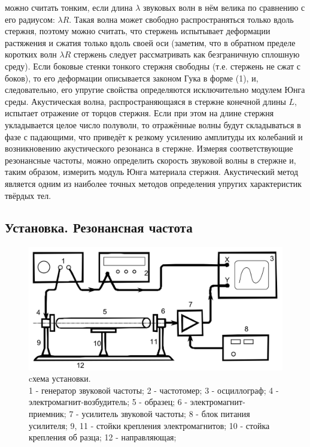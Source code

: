 \documentclass[a4paper, 10pt, twocolumn]{article}
\begin{document}
можно считать тонким, если длина $\lambda$ звуковых волн в нём велика по сравнению
 с его радиусом: $\lambda R$. Такая волна может свободно распространяться только вдоль стержня, поэтому можно считать, что стержень испытывает
 деформации растяжения и сжатия только вдоль своей оси (заметим,
что в обратном пределе коротких волн $\lambda R$ стержень следует рассматривать как безграничную сплошную среду). Если боковые стенки тонкого
стержня свободны (т.е. стержень не сжат с боков), то его деформации описывается законом Гука в форме (1), и, следовательно, его упругие свойства
определяются исключительно модулем Юнга среды.
Акустическая волна, распространяющаяся в стержне конечной длины $L$,
испытает отражение от торцов стержня. Если при этом на длине стержня
укладывается целое число полуволн, то отражённые волны будут складываться в фазе с падающими, что приведёт к резкому усилению амплитуды
их колебаний и возникновению акустического резонанса в стержне. Измеряя соответствующие резонансные частоты, можно определить скорость
звуковой волны в стержне и, таким образом, измерить модуль Юнга материала стержня. Акустический метод является одним из наиболее точных
методов определения упругих характеристик твёрдых тел.
\subsection{Установка. Резонансная частота}
\begin{figure}[h]
    \includegraphics[width=1\linewidth]{images/installation.png}
    \begin{center}
        \caption{cхема установки. \\ 1 - генератор звуковой частоты; 2 - частотомер; 3 - осциллограф; 4 - 
    электромагнит-возбудитель; 5 - образец; 6 - электромагнит-приемник; 7 - усилитель звуковой частоты;
     8 - блок питания усилителя; 9, 11 - стойки крепления электромагнитов; 10 - стойка крепления об
     разца; 12 - направляющая;}
    \end{center}
\end{figure} 
\end{document}
